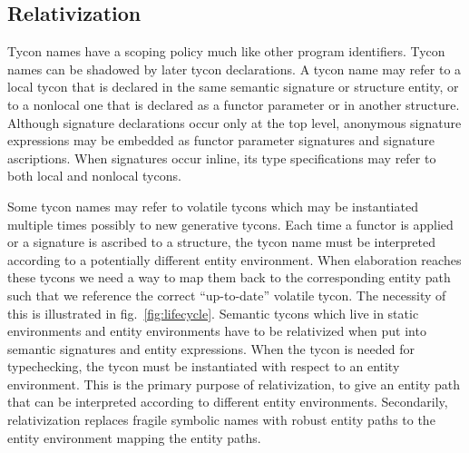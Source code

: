 \documentclass[9pt,nocopyrightspace, fleqn]{sigplanconf}
\begin{document}


\subsection{Relativization}\label{sec:relativization}
Tycon names have a scoping policy much like other program
identifiers. Tycon names can be shadowed by later tycon
declarations. A tycon name may refer to a local tycon that is declared
in the same semantic signature or structure entity, or to a nonlocal
one that is declared as a functor parameter or in another
structure. Although signature declarations occur only at the top
level, anonymous signature expressions may be embedded as functor
parameter signatures and signature ascriptions. When signatures occur
inline, its type specifications may refer to both local and nonlocal
tycons.

Some tycon names may refer to volatile tycons which may be
instantiated multiple times possibly to new generative tycons. Each
time a functor is applied or a signature is ascribed to a structure, the
tycon name must be interpreted according to a potentially different
entity environment. When elaboration reaches these tycons we need a
way to map them back to the corresponding entity path such that we
reference the correct ``up-to-date'' volatile tycon. The necessity of
this is illustrated in fig.~\ref{fig:lifecycle}. Semantic tycons which
live in static environments and entity environments have to be
relativized when put into semantic signatures and entity
expressions. When the tycon is needed for typechecking, the tycon must
be instantiated with respect to an entity environment. This is the
primary purpose of relativization, to give an entity path that can be
interpreted according to different entity environments. Secondarily,
relativization replaces fragile symbolic names with robust entity
paths to the entity environment mapping the entity paths.
\end{document}
